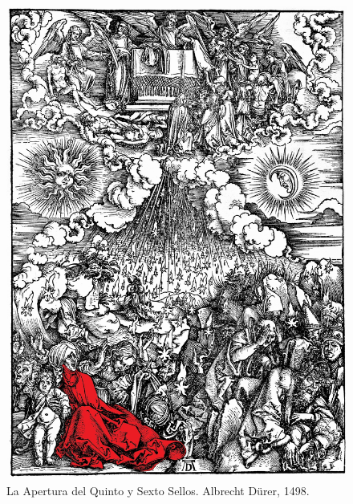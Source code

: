   \begin{figure}[p]
  	\centering
  	\includegraphics[width=\linewidth]{Durer/Durer_Sixth_Seal.jpg}
  	\caption[La Apertura del Quinto y Sexto Sellos]{La Apertura del Quinto y Sexto Sellos. Albrecht Dürer, 1498.}
  \end{figure}
